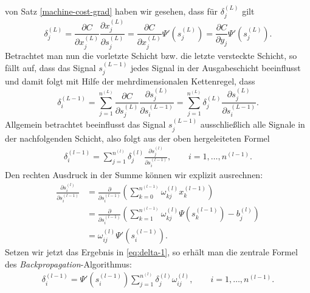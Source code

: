 von Satz \ref{machine-cost-grad} haben wir gesehen, dass für $\delta_j^{(L)}$ gilt
\[
    \delta_j^{(L)}= \frac{\partial C}{\partial x_j^{(L)}} \frac{\partial x_j^{(L)}}{\partial s_j^{(L)}}= \frac{\partial C}{\partial x_j^{(L)}} \Psi '(s_j^{(L)})
    =\frac{\partial C}{\partial y_j} \Psi '(s_j^{(L)}).
\]
Betrachtet man nun die vorletzte Schicht bzw. die letzte versteckte Schicht, so fällt auf, dass das Signal
$s_j^{(L-1)}$ jedes Signal in der Ausgabeschicht beeinflusst und damit folgt mit Hilfe der mehrdimensionalen
Kettenregel, dass
\[
    \delta_i^{(L-1)}= \sum\limits_{j=1}^{n^{(L)}} \frac{\partial C}{\partial s_j^{(L)}}
    \frac{\partial s_j^{(L)}}{\partial s_i^{(L-1)}}
    = \sum\limits_{j=1}^{n^{(L)}} \delta_j^{(L)} \frac{\partial s_j^{(L)}}{\partial s_i^{(L-1)}}.
\]
Allgemein betrachtet beeinflusst das Signal $s_j^{(L-1)}$ ausschließlich alle Signale in der nachfolgenden Schicht,
also folgt aus der oben hergeleiteten Formel
\begin{align}
    \delta_i^{(l-1)}= \sum\limits_{j=1}^{n^{(l)}} \delta_j^{(l)} \frac{\partial s_j^{(l)}}{\partial s_i^{(l-1)}},
    \qquad i = 1, \dots, n^{(l-1)}. \label{eq:delta-1}
\end{align}
Den rechten Ausdruck in der Summe können wir explizit ausrechnen:
\begin{align*}
    \frac{\partial s_i^{(l)}}{\partial s_i^{(l-1)}}
    &= \frac{\partial}{\partial s_i^{(l-1)}} (\sum\limits_{k=0}^{n^{(l-1)}}\omega_{kj}^{(l)}x_{k}^{(l-1)})\\
    &= \frac{\partial}{\partial s_i^{(l-1)}} (\sum\limits_{k=1}^{n^{(l-1)}}\omega_{kj}^{(l)}\Psi(s_{k}^{(l-1)}) - b_j^{(l)}) \\
    &= \omega_{ij}^{(l)}\Psi'(s_i^{(l-1)}).
\end{align*}
Setzen wir jetzt das Ergebnis in \eqref{eq:delta-1}, so erhält man die zentrale Formel des
\textit{Backpropagation}-Algorithmus:
\begin{align}
    \delta_i^{(l-1)} = \Psi'(s_i^{(l-1)})\sum\limits_{j=1}^{n^{(l)}} \delta_j^{(l)}\omega_{ij}^{(l)},
    \qquad  i = 1, \dots, n^{(l-1)}. \label{eq:delta-final}
\end{align}

